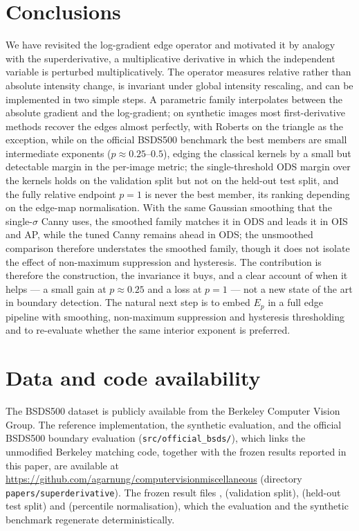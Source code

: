\documentclass[conference]{IEEEtran}
\begin{document}
\section{Conclusions}
\label{sec:conclusions}
We have revisited the log-gradient edge operator and motivated it by analogy with
the superderivative, a multiplicative derivative in which the independent
variable is perturbed multiplicatively.  The operator measures relative rather
than absolute intensity change, is invariant under global intensity rescaling,
and can be implemented in two simple steps.  A parametric family interpolates
between the absolute gradient and the log-gradient; on synthetic images most
first-derivative methods recover the edges almost perfectly, with Roberts on the
triangle as the exception, while on the official
BSDS500 benchmark the best members are small intermediate exponents
($p\approx0.25$--$0.5$), edging the classical kernels by a small but detectable
margin in the per-image metric; the single-threshold ODS margin over the kernels holds
on the validation split but not on the held-out test split, and the fully relative
endpoint $p=1$ is never the best member, its ranking depending on the edge-map
normalisation.  With the same Gaussian smoothing that
the single-$\sigma$ Canny uses, the smoothed family matches it in ODS and leads it
in OIS and AP, while the tuned Canny remains ahead in ODS; the unsmoothed
comparison therefore understates the smoothed family, though it does not isolate the
effect of non-maximum suppression and hysteresis.  The contribution is therefore
the construction, the invariance it buys, and a clear account of when it helps --- a
small gain at $p\approx0.25$ and a loss at $p=1$ --- not
a new state of the art in boundary detection.  The natural next step is to embed
$E_p$ in a full edge pipeline with smoothing, non-maximum suppression and
hysteresis thresholding and to re-evaluate whether the same interior exponent is
preferred.

\section*{Data and code availability}
The BSDS500 dataset is publicly available from the Berkeley Computer Vision
Group.  The reference implementation, the synthetic evaluation, and the official
BSDS500 boundary evaluation (\texttt{src/official\_bsds/}), which links the
unmodified Berkeley matching code, together with the frozen results reported in this
paper, are available at
\url{https://github.com/agarnung/computervisionmiscellaneous} (directory
\texttt{papers/superderivative}).  The frozen result files
,
 (validation split),
 (held-out test split) and
 (percentile
normalisation), which the evaluation and the synthetic benchmark regenerate
deterministically.
\end{document}
